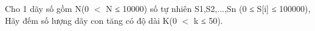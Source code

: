 Cho 1 dãy số gồm N(0 $<$ N ≤ 10000) số tự nhiên S1,S2,...,Sn (0 ≤ S[i] ≤ 100000), Hãy đếm số lượng dãy con tăng có độ dài K(0 $<$ k ≤ 50).  

\